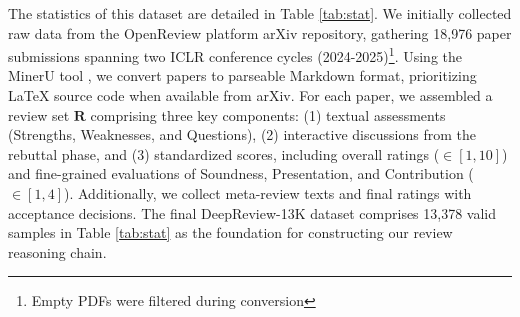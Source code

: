 \documentclass{article}
\begin{document}
\begin{table}[h]
\centering

\label{tab:dataset_statistics}
\vspace{0.25cm}
\caption{Dataset Statistics. The table shows the average values of Tokens, Rating, and Accept Rate}
\label{tab:stat}
\end{table}
The statistics of this dataset are detailed in Table \ref{tab:stat}. We initially collected raw data from the OpenReview platform arXiv repository, gathering 18,976 paper submissions spanning two ICLR conference cycles (2024-2025)\footnote{Empty PDFs were filtered during conversion}. Using the MinerU tool \citep{wang2024mineruopensourcesolutionprecise}, we convert papers to parseable Markdown format, prioritizing \LaTeX{} source code when available from arXiv. For each paper, we assembled a review set $\mathbf{R}$ comprising three key components:  (1) textual assessments (Strengths, Weaknesses, and Questions), (2) interactive discussions from the rebuttal phase, and (3) standardized scores, including overall ratings ($\in [1,10]$) and fine-grained evaluations of Soundness, Presentation, and Contribution ($\in [1,4]$). Additionally, we collect meta-review texts and final ratings with acceptance decisions. The final DeepReview-13K dataset comprises 13,378 valid samples in Table \ref{tab:stat} as the foundation for constructing our review reasoning chain.


\end{document}
